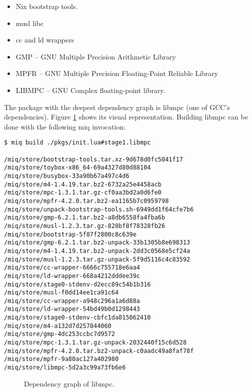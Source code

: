 \begin{itemize}
    \item Nix bootstrap tools.
    \item musl libc
    \item cc and ld wrappers
    \item GMP -- GNU
    Multiple Precision
    Arithmetic Library
    \item MPFR -- GNU Multiple Precision Floating-Point Reliable Library
    \item LIBMPC -- GNU Complex floating-point library.
\end{itemize}

The package with the deepest dependency graph is libmpc (one
of GCC's dependencies). Figure \ref{fig:results} shows its
visual representation. Building libmpc can be done with the
following miq invocation:

\begin{verbatim}
$ miq build ./pkgs/init.lua#stage1.libmpc

/miq/store/bootstrap-tools.tar.xz-9d678d0fc5041f17
/miq/store/toybox-x86_64-69a4327d80d88104
/miq/store/busybox-33a90b67a497c4d6
/miq/store/m4-1.4.19.tar.bz2-6732a25e4458acb
/miq/store/mpc-1.3.1.tar.gz-cf0aa3bd2a0d6fe0
/miq/store/mpfr-4.2.0.tar.bz2-ea1165b7c0959798
/miq/store/unpack-bootstrap-tools.sh-6949dd1f64cfe7b6
/miq/store/gmp-6.2.1.tar.bz2-a8db6558fa4fba6b
/miq/store/musl-1.2.3.tar.gz-828bf8f78328fb26
/miq/store/bootstrap-5f87f2800c8c639e
/miq/store/gmp-6.2.1.tar.bz2-unpack-33b1305b8e698313
/miq/store/m4-1.4.19.tar.bz2-unpack-2dd3c0568e5cf24a
/miq/store/musl-1.2.3.tar.gz-unpack-5f9d5116c4c83592
/miq/store/cc-wrapper-6666c755718e6aa4
/miq/store/ld-wrapper-668a4212dddee39c
/miq/store/stage0-stdenv-d2ecc89c54b1b316
/miq/store/musl-f0dd14ee1ca91c64
/miq/store/cc-wrapper-a948c296a1a6d88a
/miq/store/ld-wrapper-54bd49b0d1298443
/miq/store/stage0-stdenv-cbfc1da815062410
/miq/store/m4-a132d7d257844060
/miq/store/gmp-4dc253ccbc7d9572
/miq/store/mpc-1.3.1.tar.gz-unpack-2032440f15c6d528
/miq/store/mpfr-4.2.0.tar.bz2-unpack-c0aadc49a8faf78f
/miq/store/mpfr-9a80ac127a402980
/miq/store/libmpc-5d2a3c99a73fb6e6
\end{verbatim}




\begin{figure}[hbt]
    \centerfloat
    
    \caption{Dependency graph of libmpc.}
    \label{fig:results}
\end{figure}


